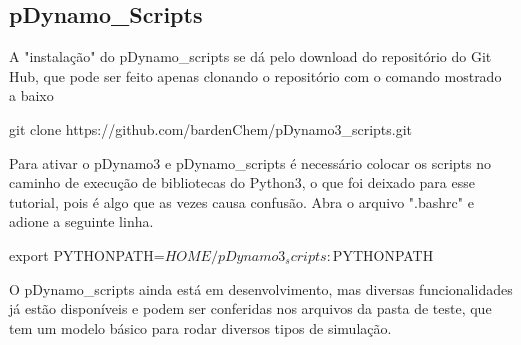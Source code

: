 \documentclass[a4paper,11pt]{refart}
\begin{document}
	\subsection{pDynamo\_Scripts}
	
	
	A "instalação" do pDynamo\_scripts se dá pelo download do repositório do Git Hub, que pode ser feito apenas clonando o repositório com o comando mostrado a baixo
	
	\hspace*{-\leftmarginwidth}
	\begin{minipage}{\fullwidth}
		\begin{commandshell}git clone https://github.com/bardenChem/pDynamo3_scripts.git\end{commandshell}
	\end{minipage}
	
	Para ativar o pDynamo3 e  pDynamo\_scripts é necessário colocar os scripts no caminho de execução de bibliotecas do Python3, o que foi deixado para esse tutorial, pois é algo que as vezes causa confusão. Abra o arquivo ".bashrc" e adione a seguinte linha. 
	
	\hspace*{-\leftmarginwidth}
	\begin{minipage}{\fullwidth}
		\begin{commandshell}export PYTHONPATH=$HOME/pDynamo3_scripts:$PYTHONPATH\end{commandshell}
	\end{minipage}
	
	O pDynamo\_scripts ainda está em desenvolvimento, mas diversas funcionalidades já estão disponíveis e podem ser conferidas nos arquivos da pasta de teste, que tem um modelo básico para rodar diversos tipos de simulação.
	
\end{document}
